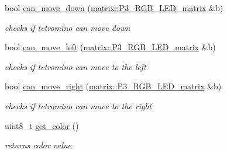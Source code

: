 \begin{DoxyCompactItemize}
bool \hyperlink{classtetris_1_1Tetromino_aba9c0120390c49a0b5b79f52a69bc48f}{can\+\_\+move\+\_\+down} (\hyperlink{classmatrix_1_1P3__RGB__LED__matrix}{matrix\+::\+P3\+\_\+\+R\+G\+B\+\_\+\+L\+E\+D\+\_\+matrix} \&b)
\begin{DoxyCompactList}\small\item\em checks if tetromino can move down \end{DoxyCompactList}\item 
bool \hyperlink{classtetris_1_1Tetromino_a6cdb8fa8fba590bfdad3e05e6d5e2699}{can\+\_\+move\+\_\+left} (\hyperlink{classmatrix_1_1P3__RGB__LED__matrix}{matrix\+::\+P3\+\_\+\+R\+G\+B\+\_\+\+L\+E\+D\+\_\+matrix} \&b)
\begin{DoxyCompactList}\small\item\em checks if tetromino can move to the left \end{DoxyCompactList}\item 
bool \hyperlink{classtetris_1_1Tetromino_a55f3f84840d8c5d5e37765a64d59d8d9}{can\+\_\+move\+\_\+right} (\hyperlink{classmatrix_1_1P3__RGB__LED__matrix}{matrix\+::\+P3\+\_\+\+R\+G\+B\+\_\+\+L\+E\+D\+\_\+matrix} \&b)
\begin{DoxyCompactList}\small\item\em checks if tetromino can move to the right \end{DoxyCompactList}\item 
uint8\+\_\+t \hyperlink{classtetris_1_1Tetromino_a379719e9cb92b02c84f7a4ed99d1a391}{get\+\_\+color} ()
\begin{DoxyCompactList}\small\item\em returns color value \end{DoxyCompactList}\end{DoxyCompactItemize}
